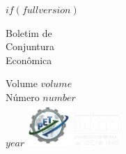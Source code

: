\documentclass[twocolumn, a4paper, 10pt]{report}
\begin{document}
    $if(fullversion)$
    \onecolumn
    \begin{titlepage}
        \begin{flushleft}
            \color{white}
            \fontsize{50}{50}
            \selectfont
            Boletim de
            \\ Conjuntura
            \\ Econômica
        \end{flushleft}
        \vspace{\fill}
        \begin{flushleft}
            \color{white}
            {\Large Volume $volume$ \\[5pt] Número $number$}
            \\[1cm]
            \fontsize{50}{50}\selectfont
            $year$
            \hfill
            \includegraphics[width=1.6cm]{images/pet.png}
            \includegraphics[width=1.8cm]{images/uft.png}
        \end{flushleft}
        \end{titlepage}
\end{document}
